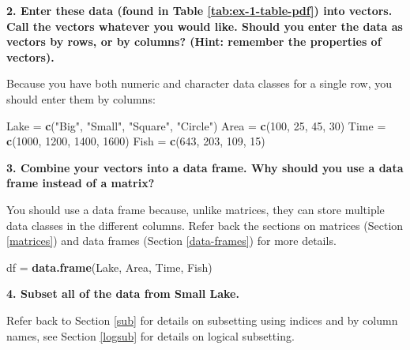 \documentclass[]{book}
\newenvironment{Shaded}{\begin{snugshade}}{\end{snugshade}}
\newcommand{\KeywordTok}[1]{\textcolor[rgb]{0.13,0.29,0.53}{\textbf{#1}}}
\newcommand{\DecValTok}[1]{\textcolor[rgb]{0.00,0.00,0.81}{#1}}
\newcommand{\StringTok}[1]{\textcolor[rgb]{0.31,0.60,0.02}{#1}}
\newcommand{\CommentTok}[1]{\textcolor[rgb]{0.56,0.35,0.01}{\textit{#1}}}
\newcommand{\OperatorTok}[1]{\textcolor[rgb]{0.81,0.36,0.00}{\textbf{#1}}}
\newcommand{\NormalTok}[1]{#1}
\theoremstyle{definition}
\theoremstyle{definition}
\theoremstyle{definition}
\theoremstyle{remark}
\begin{document}
\textbf{2. Enter these data (found in Table \ref{tab:ex-1-table-pdf})
into vectors. Call the vectors whatever you would like. Should you enter
the data as vectors by rows, or by columns? (Hint: remember the
properties of vectors).}

Because you have both numeric and character data classes for a single
row, you should enter them by columns:

\begin{Shaded}
\begin{Highlighting}[]
\NormalTok{Lake =}\StringTok{ }\KeywordTok{c}\NormalTok{(}\StringTok{"Big"}\NormalTok{, }\StringTok{"Small"}\NormalTok{, }\StringTok{"Square"}\NormalTok{, }\StringTok{"Circle"}\NormalTok{)}
\NormalTok{Area =}\StringTok{ }\KeywordTok{c}\NormalTok{(}\DecValTok{100}\NormalTok{, }\DecValTok{25}\NormalTok{, }\DecValTok{45}\NormalTok{, }\DecValTok{30}\NormalTok{)}
\NormalTok{Time =}\StringTok{ }\KeywordTok{c}\NormalTok{(}\DecValTok{1000}\NormalTok{, }\DecValTok{1200}\NormalTok{, }\DecValTok{1400}\NormalTok{, }\DecValTok{1600}\NormalTok{)}
\NormalTok{Fish =}\StringTok{ }\KeywordTok{c}\NormalTok{(}\DecValTok{643}\NormalTok{, }\DecValTok{203}\NormalTok{, }\DecValTok{109}\NormalTok{, }\DecValTok{15}\NormalTok{)}
\end{Highlighting}
\end{Shaded}

\textbf{3. Combine your vectors into a data frame. Why should you use a
data frame instead of a matrix?}

You should use a data frame because, unlike matrices, they can store
multiple data classes in the different columns. Refer back the sections
on matrices (Section \ref{matrices}) and data frames (Section
\ref{data-frames}) for more details.

\begin{Shaded}
\begin{Highlighting}[]
\NormalTok{df =}\StringTok{ }\KeywordTok{data.frame}\NormalTok{(Lake, Area, Time, Fish)}
\end{Highlighting}
\end{Shaded}

\textbf{4. Subset all of the data from Small Lake.}

Refer back to Section \ref{sub} for details on subsetting using indices
and by column names, see Section \ref{logsub} for details on logical
subsetting.

\begin{Shaded}
\end{Shaded}
\end{document}
